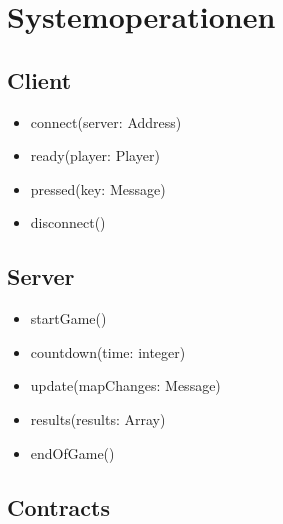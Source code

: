 \documentclass[11pt]{scrartcl}
\begin{document}
\newpage
\section{Systemoperationen}
\label{sec:Systemoperationen}
\subsection{Client}
\begin{itemize}
\item connect(server: Address)
\item ready(player: Player)
\item pressed(key: Message)
\item disconnect()
\end{itemize}

\subsection{Server}
\begin{itemize}
    \item startGame()
    \item countdown(time: integer)
    \item update(mapChanges: Message)
    \item results(results: Array)
    \item endOfGame()
\end{itemize}


\subsection{Contracts}
\label{sec:Contracts}
\end{document}

